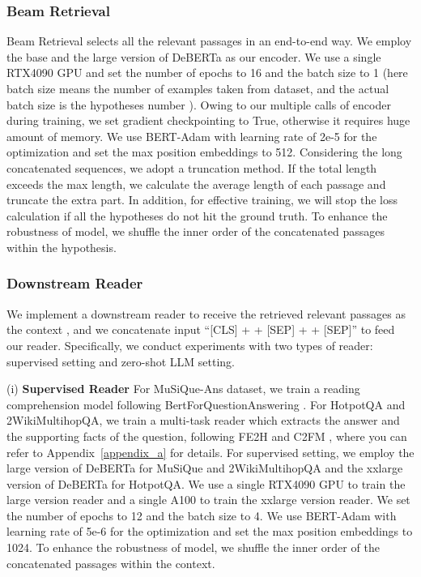 \documentclass[10.5pt]{article}
\begin{document}
\subsubsection{Beam Retrieval}
Beam Retrieval selects all the relevant passages in an end-to-end way. We employ the base and the large version of DeBERTa \cite{deberta} as our encoder. We use a single RTX4090 GPU and set the number of epochs to 16 and the batch size to 1 (here batch size means the number of examples taken from dataset, and the actual batch size is the hypotheses number ). Owing to our multiple calls of encoder during training, we set gradient checkpointing to True, otherwise it requires huge amount of memory. We use BERT-Adam with learning rate of 2e-5 for the optimization and set the max position embeddings to 512. Considering the long concatenated sequences, we adopt a truncation method. If the total length exceeds the max length, we calculate the average length of each passage and truncate the extra part. In addition, for effective training, we will stop the loss calculation if all the hypotheses do not hit the ground truth. To enhance the robustness of model, we shuffle the inner order of the concatenated passages within the hypothesis.

\subsubsection{Downstream Reader}
We implement a downstream reader to receive the retrieved relevant passages as the context , and we concatenate input ``[CLS] +  + [SEP] +  + [SEP]'' to feed our reader. Specifically, we conduct experiments with two types of reader: supervised setting and zero-shot LLM setting.

(i) \textbf{Supervised Reader} 
For MuSiQue-Ans dataset, we train a reading comprehension model following BertForQuestionAnswering \cite{devlin-etal-2019-bert, hugging_face}. For HotpotQA and 2WikiMultihopQA, we train a multi-task reader which extracts the answer and the supporting facts of the question, following FE2H \cite{DBLP:journals/corr/abs-2205-11729} and C2FM \cite{DBLP:journals/corr/abs-2212-09512}, where you can refer to Appendix~\ref{appendix_a} for details. 
For supervised setting, we employ the large version of DeBERTa for MuSiQue and 2WikiMultihopQA and the xxlarge version of DeBERTa for HotpotQA. We use a single RTX4090 GPU to train the large version reader and a single A100 to train the xxlarge version reader. We set the number of epochs to 12 and the batch size to 4. We use BERT-Adam with learning rate of 5e-6 for the optimization and set the max position embeddings to 1024. To enhance the robustness of model, we shuffle the inner order of the concatenated passages within the context. 
\end{document}
